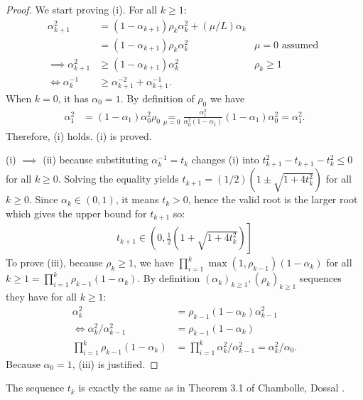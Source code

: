\documentclass[12pt]{article}
\begin{document}
    \begin{proof}
        We start proving (i). 
        For all $k \ge 1$: 
        \begin{align*}
            \alpha_{k + 1}^2 
            &= (1 - \alpha_{k + 1})\rho_k\alpha_k^2 + (\mu/L) \alpha_k
            \\
            &= (1 - \alpha_{k + 1})\rho_k\alpha_k^2 & \mu = 0 \text{ assumed } 
            \\
            \implies 
            \alpha_{k + 1}^2 
            & \ge (1 - \alpha_{k + 1})\alpha_k^2 
            &  \rho_k \ge 1
            \\
            \iff 
            \alpha_k^{-1} 
            &\ge 
            \alpha_{k + 1}^{-2} + \alpha_{k + 1}^{-1}. 
        \end{align*}
        When $k = 0$, it has $\alpha_0 = 1$. 
        By definition of $\rho_0$ we have 
        \begin{align*}
            \alpha_1^2 &= 
            (1 - \alpha_1)\alpha_0^2\rho_0 \underset{\mu = 0}{=}
            \frac{\alpha_1^2}{\alpha_0^2(1 - \alpha_1)}(1 - \alpha_1)\alpha_0^2 = \alpha_1^2. 
        \end{align*}
        Therefore, (i) holds. 
        (i) is proved. 
        \par
        (i) $\implies$ (ii) because substituting $\alpha_k^{-1} = t_k$ changes (i) into $t_{k + 1}^2 - t_{k + 1} - t_{k}^2 \le 0$ for all $k \ge 0$. 
        Solving the equality yields $t_{k + 1} = (1/2)\left(1 \pm \sqrt{1 + 4 t_k^2}\right)$ for all $k \ge 0$. 
        Since $\alpha_k \in (0, 1)$, it means $t_k > 0$, hence the valid root is the larger root which gives the upper bound for $t_{k + 1}$ so: 
        \begin{align*}
            t_{k + 1} \in \left(
                0, \frac{1}{2}\left(1 + \sqrt{1 + 4t_k^2}\right) 
            \right]
        \end{align*}
        To prove (iii), because $\rho_k \ge 1$, we have $\prod_{i = 1}^{k} \max(1, \rho_{k - 1})(1 - 
        \alpha_k)$ for all $k \ge 1 = \prod_{i = 1}^{k}\rho_{k - 1}(1 - \alpha_k)$. 
        By definition $(\alpha_k)_{k \ge 1}, (\rho_k)_{k \ge 1}$ sequences they have for all $k \ge 1$: 
        \begin{align*}
            \alpha_k^2 &= \rho_{k - 1}(1 - \alpha_k)\alpha_{k - 1}^2
            \\
            \iff 
            \alpha_k^2/\alpha_{k - 1}^2 &= \rho_{k - 1}(1 - \alpha_k)
            \\
            \prod_{i = 1}^{k}\rho_{k - 1}(1 - \alpha_k)
            &= 
            \prod_{i = 1}^{k}\alpha_k^2 /\alpha_{k - 1}^2= \alpha_k^2/\alpha_0. 
        \end{align*}
        Because $\alpha_0 = 1$, (iii) is justified. 
    \end{proof}
    \begin{remark}
        The sequence $t_k$ is exactly the same as in Theorem 3.1 of Chambolle, Dossal \cite{chambolle_convergence_2015}. 
    \end{remark}
\end{document}
